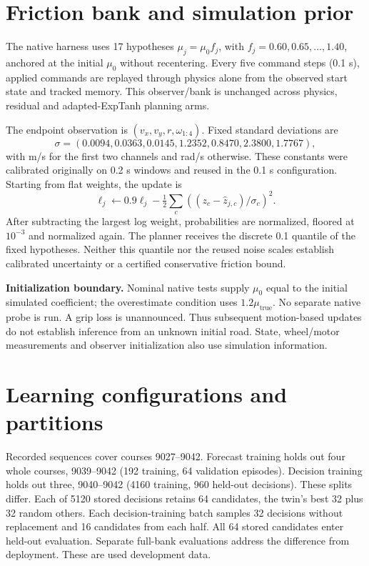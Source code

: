 \documentclass[11pt]{article}
\begin{document}
\section{Friction bank and simulation prior}
The native harness uses 17 hypotheses $\mu_j=\mu_0f_j$, with $f_j=0.60,0.65,\ldots,1.40$, anchored at the initial $\mu_0$ without recentering. Every five command steps (0.1 s), applied commands are replayed through physics alone from the observed start state and tracked memory. This observer/bank is unchanged across physics, residual and adapted-ExpTanh planning arms.

The endpoint observation is $(v_x,v_y,r,\omega_{1:4})$. Fixed standard deviations are
\[\sigma=(0.0094,0.0363,0.0145,1.2352,0.8470,2.3800,1.7767),\]
with m/s for the first two channels and rad/s otherwise. These constants were calibrated originally on 0.2 s windows and reused in the 0.1 s configuration. Starting from flat weights, the update is
\[
\ell_j\leftarrow0.9\ell_j-\tfrac12\sum_c((z_c-\hat z_{j,c})/\sigma_c)^2.
\]
After subtracting the largest log weight, probabilities are normalized, floored at $10^{-3}$ and normalized again. The planner receives the discrete 0.1 quantile of the fixed hypotheses. Neither this quantile nor the reused noise scales establish calibrated uncertainty or a certified conservative friction bound.

\textbf{Initialization boundary.} Nominal native tests supply $\mu_0$ equal to the initial simulated coefficient; the overestimate condition uses $1.2\mu_{\mathrm{true}}$. No separate native probe is run. A grip loss is unannounced. Thus subsequent motion-based updates do not establish inference from an unknown initial road. State, wheel/motor measurements and observer initialization also use simulation information.

\section{Learning configurations and partitions}
Recorded sequences cover courses 9027--9042. Forecast training holds out four whole courses, 9039--9042 (192 training, 64 validation episodes). Decision training holds out three, 9040--9042 (4160 training, 960 held-out decisions). These splits differ. Each of 5120 stored decisions retains 64 candidates, the twin's best 32 plus 32 random others. Each decision-training batch samples 32 decisions without replacement and 16 candidates from each half. All 64 stored candidates enter held-out evaluation. Separate full-bank evaluations address the difference from deployment. These are used development data.
\end{document}
